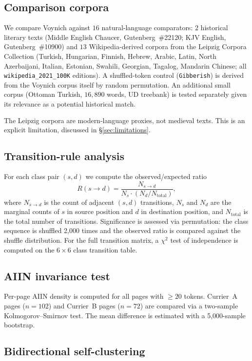 \documentclass[11pt]{article}
\begin{document}
\subsection{Comparison corpora}

We compare Voynich against $16$ natural-language comparators:
$2$ historical literary texts (Middle English Chaucer, Gutenberg~\#22120;
KJV English, Gutenberg~\#10900) and $13$ Wikipedia-derived corpora from the
Leipzig Corpora Collection (Turkish, Hungarian, Finnish, Hebrew, Arabic,
Latin, North Azerbaijani, Italian, Estonian, Swahili, Georgian, Tagalog,
Mandarin Chinese; all \texttt{wikipedia\_2021\_100K} editions). A shuffled-token control (\texttt{Gibberish}) is derived from the
Voynich corpus itself by random permutation. An additional small corpus
(Ottoman Turkish, $16{,}890$ words, UD treebank) is tested separately given
its relevance as a potential historical match.

The Leipzig corpora are modern-language proxies, not medieval texts. This is
an explicit limitation, discussed in \S\ref{sec:limitations}.

\subsection{Transition-rule analysis}

For each class pair $(s, d)$ we compute the observed/expected ratio
\[
  R(s \to d) = \frac{N_{s \to d}}{N_s \cdot (N_d / N_{\text{total}})},
\]
where $N_{s \to d}$ is the count of adjacent $(s, d)$ transitions, $N_s$
and $N_d$ are the marginal counts of $s$ in source position and $d$ in
destination position, and $N_{\text{total}}$ is the total number of
transitions. Significance is assessed via permutation: the class sequence is
shuffled 2{,}000 times and the observed ratio is compared against the
shuffle distribution. For the full transition matrix, a $\chi^2$ test of
independence is computed on the $6 \times 6$ class transition table.

\subsection{AIIN invariance test}

Per-page AIIN density is computed for all pages with $\geq 20$ tokens.
Currier~A pages ($n = 102$) and Currier~B pages ($n = 72$) are compared via
a two-sample Kolmogorov--Smirnov test. The mean difference is estimated with
a 5{,}000-sample bootstrap.

\subsection{Bidirectional self-clustering}
\end{document}
